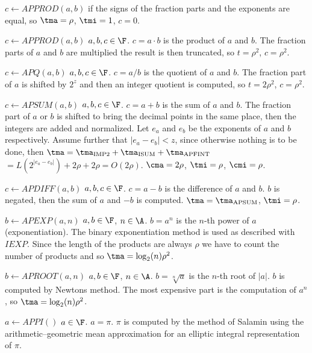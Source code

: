 \begin{deflist}{$c \gets APPROD(a,b)$}
     if the signs of the fraction parts and the 
     exponents are equal, so 
     $\tma = \rho$, $\tmi = 1$, $c = 0$. 
\item[$c \gets APPROD(a,b)$] $a, b, c \in \F$. 
     $c = a \cdot b$ is the product of $a$ and $b$.
     The fraction parts of $a$ and $b$ are multiplied
     the result is then truncated,
     so $t = \rho^2$, $c = \rho^2$. 
\item[$c \gets APQ(a,b)$] $a, b, c \in \F$. 
     $c = a / b$ is the quotient of $a$ and $b$.
     The fraction part of $a$ is shifted by $2^z$ 
     and then an integer quotient is computed, so 
     $t = 2 \rho^2$, $c = \rho^2$. 
\item[$c \gets APSUM(a,b)$] $a, b, c \in \F$. 
     $c = a + b$ is the sum of $a$ and $b$.
     The fraction part of $a$ or $b$ is shifted
     to bring the decimal points in the same place, then 
     the integers are added and normalized.
     Let $e_a$ and $e_b$ be the exponents of $a$ and $b$ 
     respectively. Assume further that 
     $\vert e_a - e_b \vert < z$, since otherwise nothing is to 
     be done, then  
     $\tma = \tma_{{\rm IMP2}} + \tma_{{\rm ISUM}}+ \tma_{{\rm APFINT}}$ 
     $ = L(2^{\vert e_a - e_b \vert}) + 2\rho + 2\rho = O(2\rho)$.
     $\cma = 2\rho$, $\tmi = \rho$, $\cmi = \rho$.
\item[$c \gets APDIFF(a,b)$] $a, b, c \in \F$. 
     $c = a - b$ is the difference of $a$ and $b$.
     $b$ is negated, then the sum of $a$ and $-b$ is computed.
     $\tma = \tma_{{\rm APSUM}}$, $\tmi = \rho$. 
\item[$b \gets APEXP(a,n)$] $a, b \in \F$, $n \in \A$. 
     $b = a^n$ is the $n$-th power of $a$ (exponentiation).
     The binary exponentiation method is used as described
     with $IEXP$. Since the length of the products 
     are always $\rho$ we have to count the number of products 
     and so $\tma = \log_2(n) \rho^2$. 
\item[$b \gets APROOT(a,n)$] $a, b \in \F$, $n \in \A$. 
     $b = \sqrt[n]{a}$ is the $n$-th root of $\vert a \vert$.
     $b$ is computed by Newtons method. 
     The most expensive part is the computation of $a^n$, so
     $\tma = \log_2(n) \rho^2$.
\item[$a \gets APPI()$] $a \in \F$. 
     $a = \pi$.
     $\pi$ is computed by the method of Salamin
     using the arithmetic--geometric mean approximation 
     for an elliptic integral representation of $\pi$.

\end{deflist}
